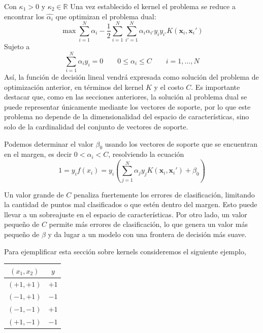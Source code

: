 \documentclass[letterpaper,12pt,oneside]{book}
\begin{document}
{{{{   
    Con $\kappa_1 > 0$ y $\kappa_2 \in \mathbb{R}$ Una vez establecido el kernel el problema se reduce  a encontrar los $\hat{\alpha_i}$ que optimizan el problema dual:
     \begin{equation}
         \max \sum_{i=1}^{N} \alpha_i - \frac{1}{2} \sum_{i=1}^{N} \sum_{i' = 1}^{N} \alpha_i \alpha_{i'} y_i y_{i'}  K(\mathbf{x}_i, \mathbf{x}_i') \label{eq: 2.41}
     \end{equation}
     Sujeto a 
     \begin{equation}
         \sum_{i=1}^{N} \alpha_i y_i=0 \quad \quad
         0 \leq \alpha_i \leq C \quad \quad i=1,  \dots,N \label{eq: 2.42}
     \end{equation}
 Así, la función de decisión lineal vendrá expresada como solución del problema de optimización anterior, en términos del kernel \( K \) y el costo \( C \). Es importante destacar que, como en las secciones anteriores, la solución al problema dual se puede representar únicamente mediante los vectores de soporte, por lo que este problema no depende de la dimensionalidad del espacio de características, sino solo de la cardinalidad del conjunto de vectores de soporte.

    
    Podemos determinar el valor $\beta_0$ usando los vectores de soporte que se encuentran en el margen, es decir $0 < \alpha_i < C$, resolviendo la ecuación 
    \begin{equation}
    	1= y_i f(x_i) =y_i \left( \sum_{j=1}^{N} \alpha_j y_j K(\mathbf{x}_i, \mathbf{x}_i') + 			\beta_0 \right) 
    \end{equation}

Un valor grande de \(C\) penaliza fuertemente los errores de clasificación, limitando la cantidad de puntos mal clasificados o que estén dentro del margen. Esto puede llevar a un sobreajuste en el espacio de características. Por otro lado, un valor pequeño de \(C\) permite más errores de clasificación, lo que genera un valor más pequeño de \(\beta\) y da lugar a un modelo con una frontera de decisión más suave.

Para ejemplificar esta sección sobre kernels consideremos el siguiente ejemplo, 


\begin{table}[h]
    \centering
    \begin{tabular}{|c|c|}
    \hline
    $(x_1, x_2)$ & $y$ \\
    \hline
    $(+1, +1)$ & $+1$ \\
    \hline
    $(-1, +1)$ & $-1$ \\
    \hline
    $(-1, -1)$ & $+1$ \\
    \hline
    $(+1, -1)$ & $-1$ \\
    \hline
    \end{tabular}
    \label{tab:datos}
\end{table}

}}}}
\end{document}
